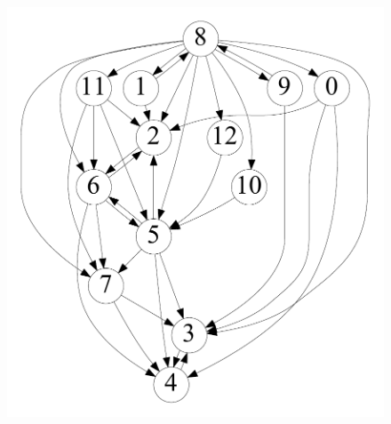 
\begin{figure}[t]
    \centering
    \begin{minipage}[b]{0.19\linewidth}
        \captionsetup{type=figure}
        \centering
            {\includegraphics[width=\textwidth]{./alg_fig/scc-g0}}
    \end{minipage}
   	\begin{minipage}[b]{0.19\linewidth}
        \centering

\end{minipage}
\end{figure}
